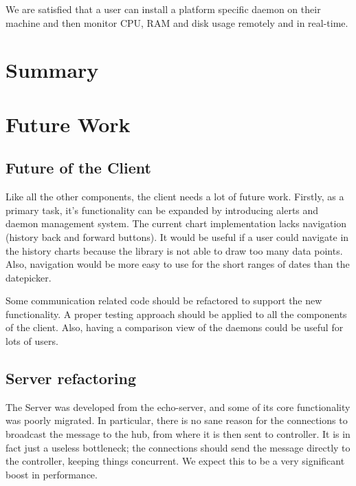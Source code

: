 \documentclass{l3proj}
\begin{document}
We are satisfied that a user can install a platform specific daemon on their machine and then monitor CPU, RAM and disk usage remotely and in real-time.


\section{Summary}


\section{Future Work}

\subsection{Future of the Client}

Like all the other components, the client needs a lot of future work. Firstly, as a primary task, it's functionality can be expanded by introducing alerts and daemon management system. The current chart implementation lacks navigation (history back and forward buttons). It would be useful if a user could navigate in the history charts because the library is not able to draw too many data points. Also, navigation would be more easy to use for the short ranges of dates than the datepicker.

Some communication related code should be refactored to support the new functionality. A proper testing approach should be applied to all the components of the client. Also, having a comparison view of the daemons could be useful for lots of users.

\subsection{Server refactoring}

The Server was developed from the echo-server, and some of its core functionality was poorly migrated. In particular, there is no sane reason for the connections to broadcast the message to the hub, from where it is then sent to controller. It is in fact just a useless bottleneck; the connections should send the message directly to the controller, keeping things concurrent. We expect this to be a very significant boost in performance.
\end{document}
